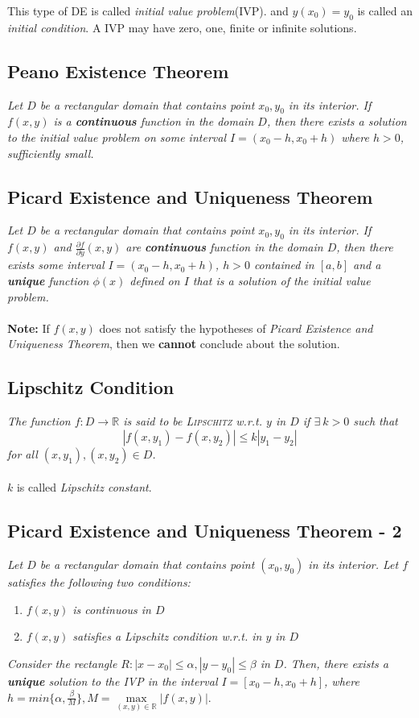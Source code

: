 \documentclass[oneside]{book}
\begin{document}
\noindent This type of DE is called \textit{initial value problem}(IVP). and \(y(x_0) = y_0\) is called an \textit{initial condition}.
A IVP may have zero, one, finite or infinite solutions.

\subsection{Peano Existence Theorem}
\noindent\textit{Let \(D\) be a rectangular domain that contains point \(x_0, y_0\) in its interior. If \(f(x, y)\) is a \textbf{continuous} function in the domain \(D\), then there exists a solution to the initial value problem on some interval \(I = (x_0 - h, x_0 + h)\) where \(h>0\), sufficiently small.}

\subsection{Picard Existence and Uniqueness Theorem}
\noindent\textit{Let \(D\) be a rectangular domain that contains point \(x_0, y_0\) in its interior. If \(f(x, y)\) and \(\frac{\partial f}{\partial y}(x, y)\) are \textbf{continuous} function in the domain \(D\), then there exists some interval \(I = (x_0 - h, x_0 + h)\), \(h>0\) contained in \([a, b]\) and a \textbf{unique} function \(\phi(x)\) defined on \(I\) that is a solution of the initial value problem.}
\\\\
\noindent\textbf{Note:} If \(f(x, y)\) does not satisfy the hypotheses of \textit{Picard Existence and Uniqueness Theorem}, then we \textbf{cannot} conclude about the solution.

\subsection{Lipschitz Condition}
\noindent\textit{The function \(f: D\to\mathbb{R}\) is said to be \textsc{Lipschitz} w.r.t. \(y\) in \(D\) if \(\exists\ k>0\) such that}
\[
	|f(x, y_1) - f(x, y_2)| \leq k|y_1 - y_2|
\]
\textit{for all \((x, y_1), (x, y_2) \in D\).}
\\\\
\noindent \(k\) is called \textit{Lipschitz constant}.

\subsection{Picard Existence and Uniqueness Theorem - 2}
\textit{Let \(D\) be a rectangular domain that contains point \((x_0, y_0)\) in its interior. Let \(f\) satisfies the following two conditions:}
\begin{enumerate}
	\item \textit{\(f(x, y)\) is continuous in \(D\)}
	\item \textit{\(f(x, y)\) satisfies a Lipschitz condition w.r.t. in \(y\) in \(D\)}
\end{enumerate}
\textit{Consider the rectangle \(R: |x - x_0| \leq \alpha, |y- y_0|\leq \beta\) in \(D\). Then, there exists a \textbf{unique} solution to the IVP in the interval \(I = [x_0 - h, x_0 + h]\), where \(h = min\{\alpha, \frac{\beta}{M}\}, M = \max\limits_{(x, y)\in\mathbb{R}}|f(x, y)|\)}.




\end{document}
